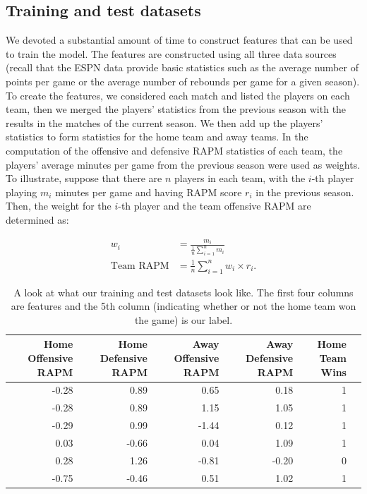 \documentclass{article} %
\begin{document}
	\subsection{Training and test datasets}
	We devoted a substantial amount of time to construct features that can be used to train the model. The features are constructed using all three data sources (recall that the ESPN data provide basic statistics such as the average number of points per game or the average number of rebounds per game for a given season). To create the features, we considered each match and listed the players on each team, then we merged the players' statistics from the previous season with the results in the matches of the current season. We then add up the players' statistics to form statistics for the home team and away teams. In the computation of the offensive and defensive RAPM statistics of each team, the players' average minutes per game from the previous season were used as weights. To illustrate, suppose that there are $n$ players in each team, with the $i$-th player  playing $m_i$ minutes per game and having RAPM score $r_i$ in the previous season. Then, the weight for the $i$-th player and the team offensive RAPM are determined as:

	\begin{align*}
		w_i &= \frac{m_i}{\frac{1}{n}\sum_{i=1}^{n} m_i} \\
		\text{Team RAPM} &= \frac{1}{n}\sum_{i=1}^{n} w_i \times r_i.
	\end{align*}

	\begin{table}[ht]
	\centering
	\begin{tabular}{rrrrrr}
	  \hline
		Home Offensive RAPM & Home Defensive RAPM & Away Offensive RAPM & Away Defensive RAPM & Home Team Wins \\ 
	  \hline
		-0.28 & 0.89 & 0.65 & 0.18 & 1 \\ 
	  	-0.28 & 0.89 & 1.15 & 1.05 & 1 \\ 
	  	-0.29 & 0.99 & -1.44 & 0.12 & 1 \\ 
	  	 0.03 & -0.66 & 0.04 & 1.09 & 1 \\ 
	  	 0.28 & 1.26 & -0.81 & -0.20 & 0 \\ 
	  	-0.75 & -0.46 & 0.51 & 1.02 & 1 \\ 
	   \hline
	\end{tabular}
	\caption{A look at what our training and test datasets look like. The first four columns are features and the 5th column (indicating whether or not the home team won the game) is our label.}
	\label{table:matrix}
	\end{table}
\end{document}
